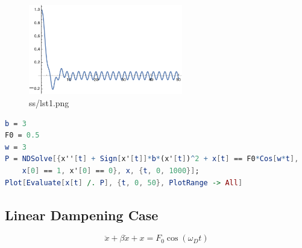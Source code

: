 \documentclass[12pt,letter]{article}
\begin{document}
{\begin{tcolorbox}
	\begin{figure}[H]
		\centering
	\includegraphics[width=0.6\textwidth]{ss/honky6.png}
		\caption{ss/lst1.png}
		\label{fig:ss-lst1-png}
	\end{figure}
\begin{lstlisting}[language=Mathematica]
b = 3
F0 = 0.5
w = 3
P = NDSolve[{x''[t] + Sign[x'[t]]*b*(x'[t])^2 + x[t] == F0*Cos[w*t], 
    x[0] == 1, x'[0] == 0}, x, {t, 0, 1000}];
Plot[Evaluate[x[t] /. P], {t, 0, 50}, PlotRange -> All]
\end{lstlisting}
\end{tcolorbox}

\newpage
\subsection*{Linear Dampening Case} 
\[
\ddot{x} + \beta \dot{x} + x = F_0 \cos(\omega_D t) \]

}
\end{document}
